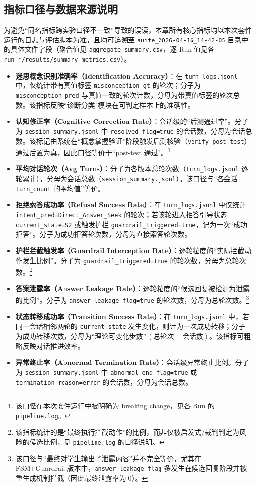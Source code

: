 \subsection{指标口径与数据来源说明}
\label{subsec:5.1.3}

为避免“同名指标跨实验口径不一致”导致的误读，本章所有核心指标均以本次套件运行的日志与评估脚本为准，且均可追溯至 \texttt{suite\_2026-04-16\_14-42-05} 目录中的具体文件字段（聚合值见 \texttt{aggregate\_summary.csv}，逐 Run 值见各 \texttt{run\_*/results/summary\_metrics.csv}）。
\begin{itemize}
    \item \textbf{迷思概念识别准确率（Identification Accuracy）}：在 \texttt{turn\_logs.jsonl} 中，仅统计带有真值标签 \texttt{misconception\_gt} 的轮次；分子为 \texttt{misconception\_pred} 与真值一致的轮次计数，分母为带真值标签的轮次总数。该指标反映“诊断分类”模块在可判定样本上的准确性。
    \item \textbf{认知修正率（Cognitive Correction Rate）}：会话级的“后测通过率”。分子为 \texttt{session\_summary.jsonl} 中 \texttt{resolved\_flag=true} 的会话数，分母为会话总数。该标记由系统在“概念掌握验证”阶段触发后测核验（\texttt{verify\_post\_test}）通过后置为真，因此口径等价于“post-test 通过”。\footnote{该口径在本次套件运行中被明确为 breaking change，见各 Run 的 \texttt{pipeline.log}。}
    \item \textbf{平均对话轮次（Avg Turns）}：分子为各版本总轮次数（\texttt{turn\_logs.jsonl} 逐轮累计），分母为会话总数（\texttt{session\_summary.jsonl}）。该口径与“各会话 \texttt{turn\_count} 的平均值”等价。
    \item \textbf{拒绝索答成功率（Refusal Success Rate）}：在 \texttt{turn\_logs.jsonl} 中仅统计 \texttt{intent\_pred=Direct\_Answer\_Seek} 的轮次；若该轮进入拒答引导状态 \texttt{current\_state=S2} 或触发护栏 \texttt{guardrail\_triggered=true}，记为一次“成功拒答”。分子为成功拒答轮次数，分母为直接索答轮次数。
    \item \textbf{护栏拦截触发率（Guardrail Interception Rate）}：逐轮粒度的“实际拦截动作发生比例”。分子为 \texttt{guardrail\_triggered=true} 的轮次数，分母为总轮次数。\footnote{该指标统计的是“最终执行拦截动作”的比例，而非仅被启发式/裁判判定为风险的候选比例，见 \texttt{pipeline.log} 的口径说明。}
    \item \textbf{答案泄露率（Answer Leakage Rate）}：逐轮粒度的“候选回复被检测为泄露的比例”。分子为 \texttt{answer\_leakage\_flag=true} 的轮次数，分母为总轮次数。\footnote{该口径与“最终对学生输出了泄露内容”并不完全等价，尤其在 FSM+Guardrail 版本中，\texttt{answer\_leakage\_flag} 多发生在候选回复阶段并被重生成机制拦截（因此最终泄露率为 0）。}
    \item \textbf{状态转移成功率（Transition Success Rate）}：在 \texttt{turn\_logs.jsonl} 中，若同一会话相邻两轮的 \texttt{current\_state} 发生变化，则计为一次成功转移；分子为成功转移次数，分母为“理论可变化步数”\,$(\text{总轮次}-\text{会话数})$。该指标可粗略反映对话推进效率。
    \item \textbf{异常终止率（Abnormal Termination Rate）}：会话级异常终止比例。分子为 \texttt{session\_summary.jsonl} 中 \texttt{abnormal\_end\_flag=true} 或 \texttt{termination\_reason=error} 的会话数，分母为会话总数。
\end{itemize}

